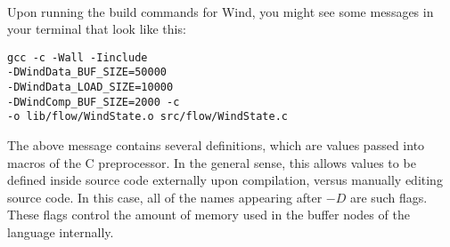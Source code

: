 \paragraph{  } Upon running the build commands for Wind, you might see some messages in your terminal that look like this:

\begin{verbatim}
gcc -c -Wall -Iinclude 
-DWindData_BUF_SIZE=50000 
-DWindData_LOAD_SIZE=10000 
-DWindComp_BUF_SIZE=2000 -c 
-o lib/flow/WindState.o src/flow/WindState.c
\end{verbatim}

\par The above message contains several definitions, which are values passed into macros of the C preprocessor. In the general sense, this allows values to be defined inside source code externally upon compilation, versus manually editing source code. In this case, all of the names appearing after $-D$ are such flags. These flags control the amount of memory used in the buffer nodes of the language internally.